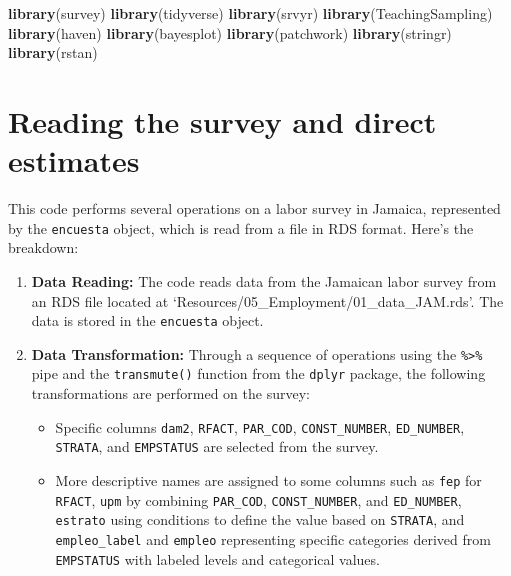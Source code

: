 \documentclass[
  12pt,
]{book}
\newenvironment{Shaded}{\begin{snugshade}}{\end{snugshade}}
\newcommand{\FunctionTok}[1]{\textcolor[rgb]{0.13,0.29,0.53}{\textbf{#1}}}
\newcommand{\NormalTok}[1]{#1}
\providecommand{\tightlist}{%
  \setlength{\itemsep}{0pt}\setlength{\parskip}{0pt}}
\begin{document}
\begin{Shaded}
\begin{Highlighting}[]
\FunctionTok{library}\NormalTok{(survey)}
\FunctionTok{library}\NormalTok{(tidyverse)}
\FunctionTok{library}\NormalTok{(srvyr)}
\FunctionTok{library}\NormalTok{(TeachingSampling)}
\FunctionTok{library}\NormalTok{(haven)}
\FunctionTok{library}\NormalTok{(bayesplot)}
\FunctionTok{library}\NormalTok{(patchwork)}
\FunctionTok{library}\NormalTok{(stringr)}
\FunctionTok{library}\NormalTok{(rstan)}
\end{Highlighting}
\end{Shaded}

\hypertarget{reading-the-survey-and-direct-estimates}{%
\section{Reading the survey and direct estimates}\label{reading-the-survey-and-direct-estimates}}

This code performs several operations on a labor survey in Jamaica, represented by the \texttt{encuesta} object, which is read from a file in RDS format. Here's the breakdown:

\begin{enumerate}
\def\labelenumi{\arabic{enumi}.}
\item
  \textbf{Data Reading:} The code reads data from the Jamaican labor survey from an RDS file located at `Resources/05\_Employment/01\_data\_JAM.rds'. The data is stored in the \texttt{encuesta} object.
\item
  \textbf{Data Transformation:} Through a sequence of operations using the \texttt{\%\textgreater{}\%} pipe and the \texttt{transmute()} function from the \texttt{dplyr} package, the following transformations are performed on the survey:

  \begin{itemize}
  \tightlist
  \item
    Specific columns \texttt{dam2}, \texttt{RFACT}, \texttt{PAR\_COD}, \texttt{CONST\_NUMBER}, \texttt{ED\_NUMBER}, \texttt{STRATA}, and \texttt{EMPSTATUS} are selected from the survey.
  \item
    More descriptive names are assigned to some columns such as \texttt{fep} for \texttt{RFACT}, \texttt{upm} by combining \texttt{PAR\_COD}, \texttt{CONST\_NUMBER}, and \texttt{ED\_NUMBER}, \texttt{estrato} using conditions to define the value based on \texttt{STRATA}, and \texttt{empleo\_label} and \texttt{empleo} representing specific categories derived from \texttt{EMPSTATUS} with labeled levels and categorical values.
  \end{itemize}
\end{enumerate}
\end{document}
